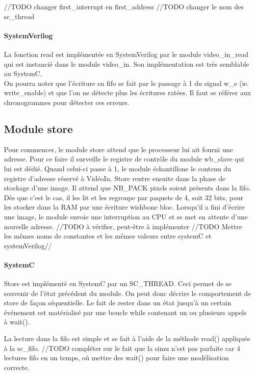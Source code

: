 \documentclass[a4paper,12pt]{report}
\begin{document}
//TODO changer first\_interrupt en first\_address
//TODO changer le nom des sc\_thread

\paragraph{SystemVerilog}
La fonction read est implémentée en SystemVerilog par le module video\_in\_read qui est instancié dans le module video\_in.
Son implémentation est très semblable au SystemC.\\
On pourra noter que l'écriture en fifo se fait par le passage à 1 du
signal w\_e (ie. write\_enable) et que l'on ne détecte plus les écritures ratées.
Il faut se référer aux chronogrammes pour détecter ces erreurs.

\subsection{Module store}
Pour commencer, le module store attend que le processeur lui ait fourni une adresse. Pour ce faire il surveille le registre de contrôle du module wb\_slave
qui lui est dédié. Quand celui-ci passe à 1, le module échantillone le contenu du registre d'adresse réservé à VidéoIn. 
Store rentre ensuite dans la phase de stockage d'une image.
Il attend que NB\_PACK pixels soient présents dans la fifo. Dès que c'est le cas, il les lit et les regroupe par paquets de 4, soit 32 bits,
pour les stocker dans la RAM par une écriture wishbone bloc. 
Lorsqu'il a fini d'écrire une image, le module envoie une interruption au CPU et se met en attente d'une nouvelle adresse.
//TODO à vérifier, peut-être à implémenter
//TODO Mettre les mêmes noms de constantes et les mêmes valeurs entre systemC et systemVerilog//


\paragraph{SystemC}
Store est implémenté en SystemC par un SC\_THREAD.
Ceci permet de se souvenir de l'état précédent du module. 
On peut donc décrire le comportement de store de façon séquentielle.
Le fait de rester dans un état jusqu'à un certain événement est matérialisé par une boucle while contenant un ou plusieurs appels à wait(). 

La lecture dans la fifo est simple et se fait à l'aide de la méthode read() appliquée à la sc\_fifo.
//TODO compléter sur le fait que la simu n'est pas parfaite car 4 lectures fifo en un temps, où mettre des wait() pour faire une modélisation correcte.
\end{document}
